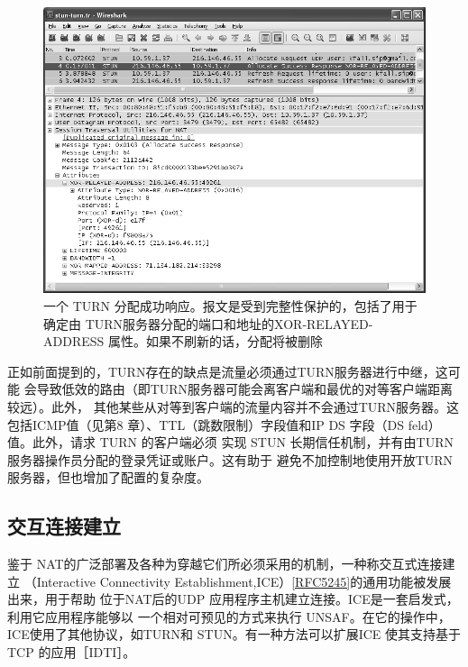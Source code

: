 \begin{figure}[H]
  \centering
  \includegraphics[scale=0.5]{imgs/7/7-15.png}
  \caption{一个 TURN 分配成功响应。报文是受到完整性保护的，包括了用于确定由
  TURN服务器分配的端口和地址的XOR-RELAYED-ADDRESS 属性。如果不刷新的话，分配将被删除}
\end{figure}

正如前面提到的，TURN存在的缺点是流量必须通过TURN服务器进行中继，这可能
会导致低效的路由（即TURN服务器可能会离客户端和最优的对等客户端距离较远）。此外，
其他某些从对等到客户端的流量内容并不会通过TURN服务器。这包括ICMP值（见第8
章）、TTL（跳数限制）字段值和IP DS 字段（DS feld）值。此外，请求 TURN 的客户端必须
实现 STUN 长期信任机制，并有由TURN服务器操作员分配的登录凭证或账户。这有助于
避免不加控制地使用开放TURN 服务器，但也增加了配置的复杂度。

\subsection{交互连接建立}

鉴于 NAT的广泛部署及各种为穿越它们所必须采用的机制，一种称交互式连接建立
（Interactive Connectivity
Establishment,ICE）\href{https://www.rfc-editor.org/rfc/rfc5245}{[RFC5245]}的通用功能被发展出来，用于帮助
位于NAT后的UDP 应用程序主机建立连接。ICE是一套启发式，利用它应用程序能够以
一个相对可预见的方式来执行 UNSAF。在它的操作中，ICE使用了其他协议，如TURN和
STUN。有一种方法可以扩展ICE 使其支持基于TCP 的应用［IDTI］。

